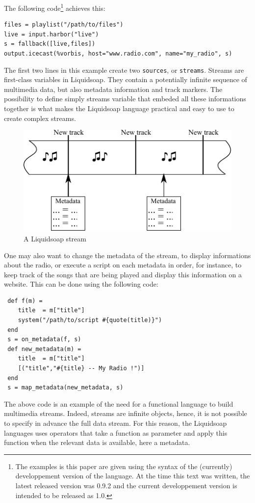 \documentclass{llncs}
\newcommand{\liquidsoap}{Liquidsoap}
\begin{document}
The following code\footnote{The examples is this paper
are given using the syntax of the (currently) developpement version of the language. 
At the time this text was written, the latest released version was 0.9.2 and 
the current developpement version is intended to be released as 1.0.} achieves this:
\begin{verbatim}
files = playlist("/path/to/files")
live = input.harbor("live")
s = fallback([live,files])
output.icecast(%vorbis, host="www.radio.com", name="my_radio", s)
\end{verbatim}

The first two lines in this example create two \texttt{sources}, or \texttt{streams}. Streams are 
first-class variables in \liquidsoap{}. They contain a potentially infinite sequence of multimedia 
data, but also metadata information and track markers. The possibility to define simply streams 
variable that embeded all these informations together is what makes the \liquidsoap{} language 
practical and easy to use to create complex streams.

\begin{figure}[htn]
 \begin{center}
\includegraphics{stream}
\end{center}
 \caption{A \liquidsoap{} stream}
\end{figure}

One may also want to change the metadata of the stream,
to display informations about the radio, or execute a script on each metadata 
in order, for instance, to keep track of the songs that are being played and 
display this information on a website. This can be done using the following code:
\begin{verbatim}
 def f(m) = 
    title  = m["title"]
    system("/path/to/script #{quote(title)}")
 end
 s = on_metadata(f, s)
 def new_metadata(m) = 
    title  = m["title"]
    [("title","#{title} -- My Radio !")]
 end
 s = map_metadata(new_metadata, s)
\end{verbatim}
The above code is an example of the need for a functional language to build multimedia 
streams. Indeed, streams are infinite objects, hence, it is not possible to specify in advance
the full data stream. For this reason, the \liquidsoap{} languages uses operators that take 
a function as parameter and apply this function when the relevant data is available, here 
a metadata.
\end{document}
